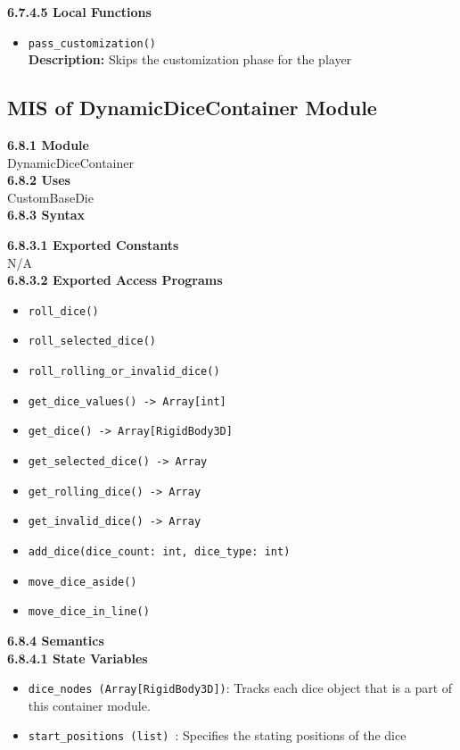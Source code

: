 \documentclass[12pt, titlepage]{article}
\begin{document}
\textbf{6.7.4.5 Local Functions}

\begin{itemize}
    \item \texttt{pass\_customization()}\\
    	\textbf{Description:} Skips the customization phase for the player
\end{itemize}


\subsection{MIS of DynamicDiceContainer Module}\label{DynamicDiceContainer}
\textbf{6.8.1 Module}\\
 DynamicDiceContainer\\

\noindent \textbf{6.8.2 Uses}\\
CustomBaseDie \\

\noindent \textbf{6.8.3 Syntax}

\noindent \textbf{6.8.3.1 Exported Constants}\\
N/A\\

\textbf{6.8.3.2 Exported Access Programs}
\begin{itemize}
	\item \texttt{roll\_dice() }
	\item \texttt{roll\_selected\_dice() }
	\item \texttt{roll\_rolling\_or\_invalid\_dice() }
	\item \texttt{get\_dice\_values() -> Array[int] }
	\item \texttt{get\_dice() -> Array[RigidBody3D]  }
	\item \texttt{get\_selected\_dice() -> Array }
	\item \texttt{get\_rolling\_dice() -> Array }
	\item \texttt{get\_invalid\_dice() -> Array  }
	\item \texttt{add\_dice(dice\_count: int, dice\_type: int)}
	\item \texttt{move\_dice\_aside() }
	\item \texttt{move\_dice\_in\_line() }
	
\end{itemize}

\noindent \textbf{6.8.4 Semantics}\\
\textbf{6.8.4.1 State Variables}\\
\begin{itemize}
	\item \texttt{dice\_nodes (Array[RigidBody3D])}: Tracks each dice object that is a part of this container module.
	\item \texttt{start\_positions (list) }: Specifies the stating positions of the dice

\end{itemize}
\end{document}
